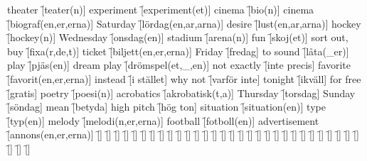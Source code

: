 \begin{questions}
    \begin{multicols}{2}
        \raggedcolumns
        \question theater \f[teater(n)]
        \question experiment \f[experiment(et)]
        \question cinema \f[bio(n)]
        \question cinema \f[biograf(en,er,erna)]
        \question Saturday \f[lördag(en,ar,arna)]
        \question desire \f[lust(en,ar,arna)]
        \question hockey \f[hockey(n)]
        \question Wednesday \f[onsdag(en)]
        \question stadium \f[arena(n)]
        \question fun \f[skoj(et)]
        \question sort out, buy \f[fixa(r,de,t)]
        \question ticket \f[biljett(en,er,erna)]
        \question Friday \f[fredag]
        \question to sound \f[låta(\_er)]
        \question play \f[pjäs(en)]
        \question dream play \f[drömspel(et,\_,en)]
        \question not exactly \f[inte precis]
        \question favorite \f[favorit(en,er,erna)]
        \question instead \f[i stället]
        \question why not \f[varför inte]
        \question tonight \f[ikväll]
        \question for free \f[gratis]
        \question poetry \f[poesi(n)]
        \question acrobatics \f[akrobatisk(t,a)]
        \question Thursday \f[torsdag]
        \question Sunday \f[söndag]
        \question mean \f[betyda]
        \question high pitch \f[hög ton]
        \question situation \f[situation(en)]
        \question type \f[typ(en)]
        \question melody \f[melodi(n,er,erna)]
        \question football \f[fotboll(en)]
        \question advertisement \f[annons(en,er,erna)]
        \question  \f[]
        \question  \f[]
        \question  \f[]
        \question  \f[]
        \question  \f[]
        \question  \f[]
        \question  \f[]
        \question  \f[]
        \question  \f[]
        \question  \f[]
        \question  \f[]
        \question  \f[]
        \question  \f[]
        \question  \f[]
        \question  \f[]
        \question  \f[]
        \question  \f[]
        \question  \f[]
        \question  \f[]
        \question  \f[]
        \question  \f[]
        \question  \f[]
        \question  \f[]
        \question  \f[]
        \question  \f[]
        \question  \f[]
        \question  \f[]
        \question  \f[]
        \question  \f[]
        \question  \f[]
        \question  \f[]
        \question  \f[]
        \question  \f[]
    \end{multicols}
\end{questions}
